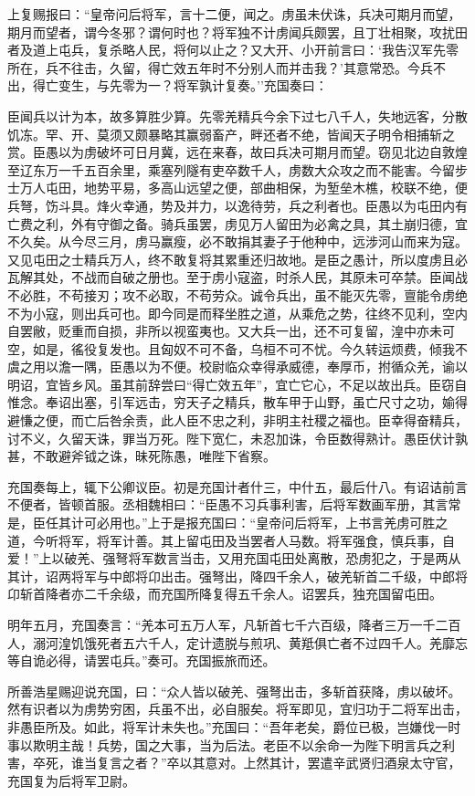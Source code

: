 \documentclass[]{article}
\begin{document}
上复赐报曰：``皇帝问后将军，言十二便，闻之。虏虽未伏诛，兵决可期月而望，期月而望者，谓今冬邪？谓何时也？将军独不计虏闻兵颇罢，且丁壮相聚，攻扰田者及道上屯兵，复杀略人民，将何以止之？又大开、小开前言曰：`我告汉军先零所在，兵不往击，久留，得亡效五年时不分别人而并击我？'其意常恐。今兵不出，得亡变生，与先零为一？将军孰计复奏。''充国奏曰：

臣闻兵以计为本，故多算胜少算。先零羌精兵今余下过七八千人，失地远客，分散饥冻。罕、开、莫须又颇暴略其赢弱畜产，畔还者不绝，皆闻天子明令相捕斩之赏。臣愚以为虏破坏可日月冀，远在来春，故曰兵决可期月而望。窃见北边自敦煌至辽东万一千五百余里，乘塞列隧有吏卒数千人，虏数大众攻之而不能害。今留步士万人屯田，地势平易，多高山远望之便，部曲相保，为堑垒木樵，校联不绝，便兵弩，饬斗具。烽火幸通，势及并力，以逸待劳，兵之利者也。臣愚以为屯田内有亡费之利，外有守御之备。骑兵虽罢，虏见万人留田为必禽之具，其土崩归德，宜不久矣。从今尽三月，虏马赢瘦，必不敢捐其妻子于他种中，远涉河山而来为寇。又见屯田之士精兵万人，终不敢复将其累重还归故地。是臣之愚计，所以度虏且必瓦解其处，不战而自破之册也。至于虏小寇盗，时杀人民，其原未可卒禁。臣闻战不必胜，不苟接刃；攻不必取，不苟劳众。诚令兵出，虽不能灭先零，亶能令虏绝不为小寇，则出兵可也。即今同是而释坐胜之道，从乘危之势，往终不见利，空内自罢敝，贬重而自损，非所以视蛮夷也。又大兵一出，还不可复留，湟中亦未可空，如是，徭役复发也。且匈奴不可不备，乌桓不可不忧。今久转运烦费，倾我不虞之用以澹一隅，臣愚以为不便。校尉临众幸得承威德，奉厚币，拊循众羌，谕以明诏，宜皆乡风。虽其前辞尝曰``得亡效五年''，宜亡它心，不足以故出兵。臣窃自惟念。奉诏出塞，引军远击，穷天子之精兵，散车甲于山野，虽亡尺寸之功，媮得避慊之便，而亡后咎余责，此人臣不忠之利，非明主社稷之福也。臣幸得奋精兵，讨不义，久留天诛，罪当万死。陛下宽仁，未忍加诛，令臣数得熟计。愚臣伏计孰甚，不敢避斧钺之诛，昧死陈愚，唯陛下省察。

充国奏每上，辄下公卿议臣。初是充国计者什三，中什五，最后什八。有诏诘前言不便者，皆顿首服。丞相魏相曰：``臣愚不习兵事利害，后将军数画军册，其言常是，臣任其计可必用也。''上于是报充国曰：``皇帝问后将军，上书言羌虏可胜之道，今听将军，将军计善。其上留屯田及当罢者人马数。将军强食，慎兵事，自爱！''上以破羌、强弩将军数言当击，又用充国屯田处离散，恐虏犯之，于是两从其计，诏两将军与中郎将卬出击。强弩出，降四千余人，破羌斩首二千级，中郎将卬斩首降者亦二千余级，而充国所降复得五千余人。诏罢兵，独充国留屯田。

明年五月，充国奏言：``羌本可五万人军，凡斩首七千六百级，降者三万一千二百人，溺河湟饥饿死者五六千人，定计遗脱与煎巩、黄羝俱亡者不过四千人。羌靡忘等自诡必得，请罢屯兵。''奏可。充国振旅而还。

所善浩星赐迎说充国，曰：``众人皆以破羌、强弩出击，多斩首获降，虏以破坏。然有识者以为虏势穷困，兵虽不出，必自服矣。将军即见，宜归功于二将军出击，非愚臣所及。如此，将军计未失也。''充国曰：``吾年老矣，爵位已极，岂嫌伐一时事以欺明主哉！兵势，国之大事，当为后法。老臣不以余命一为陛下明言兵之利害，卒死，谁当复言之者？''卒以其意对。上然其计，罢遣辛武贤归酒泉太守官，充国复为后将军卫尉。
\end{document}
